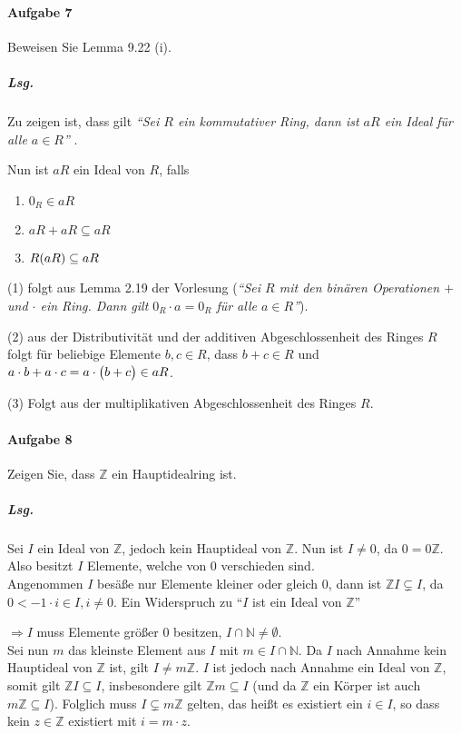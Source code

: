 \documentclass{scrreprt}
\begin{document}
\paragraph{Aufgabe 7} Beweisen Sie Lemma 9.22 (i).

\subparagraph{Lsg.} Zu zeigen ist, dass gilt
\emph{
  ``Sei $R$ ein kommutativer Ring, dann ist $aR$ ein Ideal für alle $a \in R$''
}.

Nun ist $aR$ ein Ideal von $R$, falls
\begin{enumerate}[(1)]
\item $0_R \in aR$
\item $aR + aR \subseteq aR$
\item $R\qty(aR) \subseteq aR$
\end{enumerate}
(1) folgt aus Lemma 2.19 der Vorlesung (\emph{``Sei $R$ mit den binären
  Operationen $+$ und $\cdot$ ein Ring.
  Dann gilt $0_R \cdot a = 0_R$ für alle $a \in R$''}).

\noindent
(2) aus der Distributivität und der additiven
Abgeschlossenheit des Ringes $R$ folgt für beliebige Elemente $b, c \in R$,
dass $b + c \in R$ und $a \cdot b + a \cdot c = a \cdot \qty\big(b + c) \in aR$.

\noindent
(3) Folgt aus der multiplikativen Abgeschlossenheit des Ringes $R$.

\paragraph{Aufgabe 8} Zeigen Sie, dass $\mathbb{Z}$ ein Hauptidealring ist.

\subparagraph{Lsg.} Sei $I$ ein Ideal von $\mathbb{Z}$, jedoch kein Hauptideal
von $\mathbb{Z}$.
Nun ist $I \ne \qty{0}$, da $\qty{0} = 0\mathbb{Z}$.
\noindent
Also besitzt $I$ Elemente, welche von $0$ verschieden sind. \\

\noindent
Angenommen $I$ besäße nur Elemente kleiner oder gleich $0$, dann ist
$\mathbb{Z}I \subsetneq I$, da $0 < -1 \cdot i \in I, i \ne 0$.
Ein Widerspruch zu ``$I$ ist ein Ideal von $\mathbb{Z}$''

\noindent
$\Rightarrow I$ muss Elemente größer $0$ besitzen,
$I \cap \mathbb{N} \ne \emptyset$. \\

\noindent
Sei nun $m$ das kleinste Element aus $I$ mit $m \in I \cap \mathbb{N}$.
Da $I$ nach Annahme kein Hauptideal von $\mathbb{Z}$ ist, gilt
$I \ne m\mathbb{Z}$.
$I$ ist jedoch nach Annahme ein Ideal von $\mathbb{Z}$, somit gilt
$\mathbb{Z}I \subseteq I$, insbesondere gilt $\mathbb{Z}m \subseteq I$
(und da $\mathbb{Z}$ ein Körper ist auch $m\mathbb{Z} \subseteq I$).
\noindent
Folglich muss $I \subsetneq m\mathbb{Z}$ gelten, das heißt
es existiert ein $i \in I$, so dass
kein $z \in \mathbb{Z}$ existiert mit $i = m \cdot z$. \\
\end{document}
